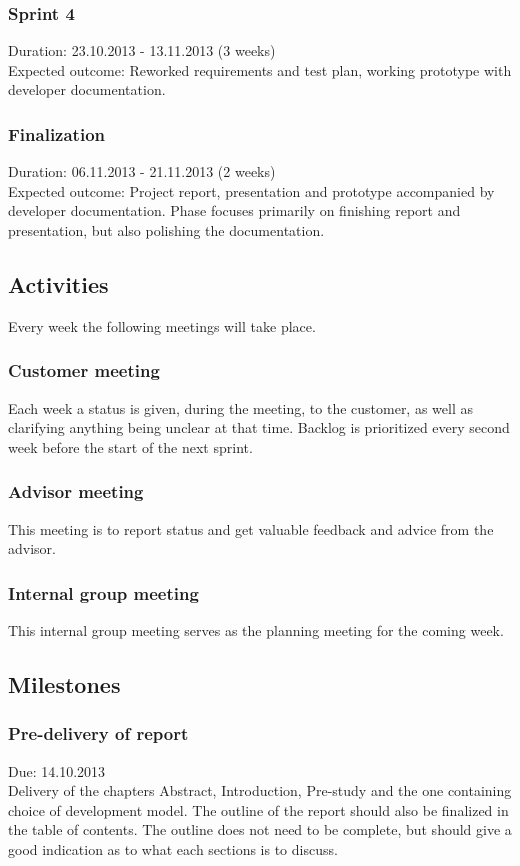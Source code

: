 \documentclass[11pt]{book}
\begin{document}
\subsubsection{Sprint 4}
Duration: 23.10.2013 - 13.11.2013 (3 weeks)\\
Expected outcome: Reworked requirements and test plan, working prototype with developer documentation.

\subsubsection{Finalization}
Duration: 06.11.2013 - 21.11.2013 (2 weeks)\\
Expected outcome: Project report, presentation and prototype accompanied by developer documentation. Phase focuses primarily on finishing report and presentation, but also polishing the documentation.

\subsection{Activities}
Every week the following meetings will take place.

\subsubsection{Customer meeting}
Each week a status is given, during the meeting, to the customer, as well as clarifying anything being unclear at that time. Backlog is prioritized every second week before the start of the next sprint.

\subsubsection{Advisor meeting}
This meeting is to report status and get valuable feedback and advice from the advisor.

\subsubsection{Internal group meeting}
This internal group meeting serves as the planning meeting for the coming week.

\subsection{Milestones}

\subsubsection{Pre-delivery of report}
Due: 14.10.2013\\
Delivery of the chapters Abstract, Introduction, Pre-study and the one containing choice of development model. The outline of the report should also be finalized in the table of contents. The outline does not need to be complete, but should give a good indication as to what each sections is to discuss.
\end{document}
